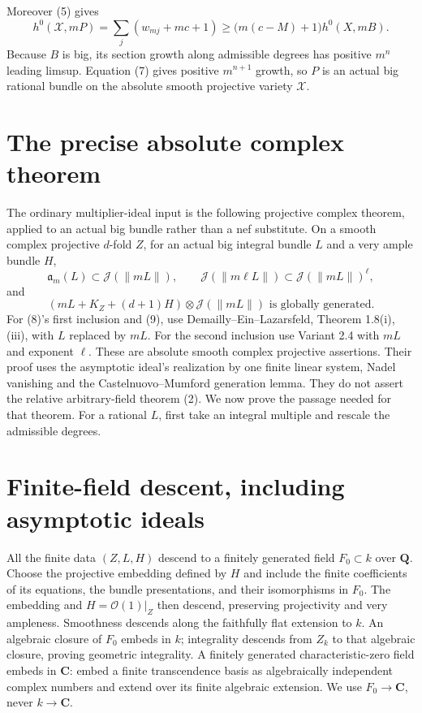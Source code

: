 \documentclass[10pt]{article}
\newcommand{\J}{\mathcal J}
\newcommand{\OO}{\mathcal O}
\begin{document}
Moreover (5) gives
\[
 h^0(\mathcal X,mP)
   =\sum_j(w_{mj}+mc+1)
   \geq\bigl(m(c-M)+1\bigr)h^0(X,mB).                  \tag{7}
\]
Because $B$ is big, its section growth along admissible degrees has
positive $m^n$ leading limsup. Equation (7) gives positive
$m^{n+1}$ growth, so $P$ is an actual big rational bundle on the
absolute smooth projective variety $\mathcal X$.

\section{The precise absolute complex theorem}
The ordinary multiplier-ideal input is the following projective
complex theorem, applied to an actual big bundle rather than a
nef substitute. On a smooth complex projective $d$-fold $Z$, for
an actual big integral bundle $L$ and a very ample bundle $H$,
\[
 \mathfrak a_m(L)\subset\J(\|mL\|),\qquad
 \J(\|m\ell L\|)\subset\J(\|mL\|)^\ell,                \tag{8}
\]
and
\[
 (mL+K_Z+(d+1)H)\otimes\J(\|mL\|)
                     \text{ is globally generated}.               \tag{9}
\]
For (8)'s first inclusion and (9), use Demailly--Ein--Lazarsfeld,
Theorem 1.8(i),(iii), with $L$ replaced by $mL$. For the second
inclusion use Variant 2.4 with $mL$ and exponent $\ell$.
These are absolute smooth complex projective assertions. Their proof
uses the asymptotic ideal's realization by one finite linear system,
Nadel vanishing and the Castelnuovo--Mumford generation lemma. They
do not assert the relative arbitrary-field theorem (2). We now prove
the passage needed for that theorem. For a rational $L$, first take
an integral multiple and rescale the admissible degrees.

\section{Finite-field descent, including asymptotic ideals}
All the finite data $(Z,L,H)$ descend to a finitely generated field
$F_0\subset k$ over $\mathbf Q$. Choose the projective embedding
defined by $H$ and include the finite coefficients of its equations,
the bundle presentations, and their isomorphisms in $F_0$. The
embedding and $H=\OO(1)|_Z$ then descend, preserving projectivity
and very ampleness. Smoothness descends along the faithfully flat
extension to $k$. An algebraic closure of $F_0$ embeds in $k$;
integrality descends from $Z_k$ to that algebraic closure, proving
geometric integrality. A finitely generated characteristic-zero
field embeds in $\mathbf C$: embed a finite transcendence basis as
algebraically independent complex numbers and extend over its finite
algebraic extension. We use $F_0\to\mathbf C$, never $k\to\mathbf C$.
\end{document}
